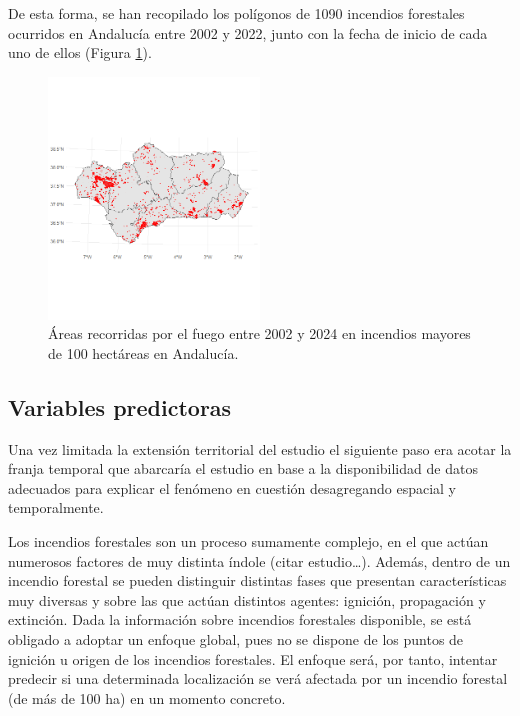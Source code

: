 \documentclass[12pt,a4paper,]{book}
\numberwithin{dummy}{section}
\theoremstyle{ocrenumbox}
\theoremstyle{blacknumex}
\theoremstyle{blacknumbox}
\theoremstyle{ocrenum}
\theoremstyle{ocrenum}
\begin{document}
De esta forma, se han recopilado los polígonos de 1090 incendios
forestales ocurridos en Andalucía entre 2002 y 2022, junto con la fecha
de inicio de cada uno de ellos (Figura \ref{fig:area_fuego}).

\begin{figure}[thb]
\centering
\includegraphics[width=0.5\textwidth]{graficos/areas_fuego.png}
\caption{Áreas recorridas por el fuego entre 2002 y 2024 en incendios mayores de 100 hectáreas en Andalucía.}
\label{fig:area_fuego}
\end{figure}

\hypertarget{variables-predictoras}{%
\subsection{Variables predictoras}\label{variables-predictoras}}

Una vez limitada la extensión territorial del estudio el siguiente paso
era acotar la franja temporal que abarcaría el estudio en base a la
disponibilidad de datos adecuados para explicar el fenómeno en cuestión
desagregando espacial y temporalmente.

Los incendios forestales son un proceso sumamente complejo, en el que
actúan numerosos factores de muy distinta índole (citar estudio\ldots).
Además, dentro de un incendio forestal se pueden distinguir distintas
fases que presentan características muy diversas y sobre las que actúan
distintos agentes: ignición, propagación y extinción. Dada la
información sobre incendios forestales disponible, se está obligado a
adoptar un enfoque global, pues no se dispone de los puntos de ignición
u origen de los incendios forestales. El enfoque será, por tanto,
intentar predecir si una determinada localización se verá afectada por
un incendio forestal (de más de 100 ha) en un momento concreto.
\end{document}
